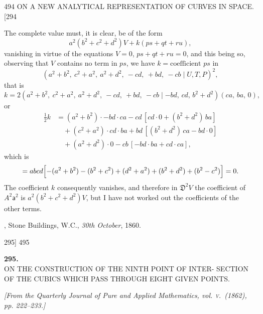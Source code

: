 \documentclass[11pt]{article}
\begin{document}
\newpage
\begin{center}
494 \hfill ON A NEW ANALYTICAL REPRESENTATION OF CURVES IN SPACE. \hfill \textsc{[294}
\end{center}

The complete value must, it is clear, be of the form
\[ a^{2}(b^{2}+c^{2}+d^{2})V+k(ps+qt+ru), \]
vanishing in virtue of the equations $V=0$, $ps+qt+ru=0$, and this being so, observing
that $V$ contains no term in $ps$, we have $k=\text{coefficient } ps$ in
\[ (a^{2}+b^{2},\ c^{2}+a^{2},\ a^{2}+d^{2},\ -cd,\ +bd,\ -cb \mid U,T,P)^{2}, \]
that is
\[ k=2(a^{2}+b^{2},\ c^{2}+a^{2},\ a^{2}+d^{2},\ -cd,\ +bd,\ -cb \mid -bd,\,cd,\,b^{2}+d^{2})(ca,\,ba,\,0), \]
or
\[ \begin{aligned}
\tfrac{1}{2}k &= (a^{2}+b^{2})\cdot -bd\cdot ca-cd\,[cd\cdot 0+(b^{2}+d^{2})\,ba]\\
&\quad +(c^{2}+a^{2})\cdot cd\cdot ba+bd\,[(b^{2}+d^{2})\,ca-bd\cdot 0]\\
&\quad +(a^{2}+d^{2})\cdot 0-cb\,[-bd\cdot ba+cd\cdot ca],
\end{aligned} \]
which is
\[ = abcd\Bigl[-(a^{2}+b^{2})-(b^{2}+c^{2})+(d^{2}+a^{2})+(b^{2}+d^{2})+(b^{2}-c^{2})\Bigr]=0. \]
The coefficient $k$ consequently vanishes, and therefore in $\mathfrak{D}^{2}V$ the coefficient of $A^{2}\mathsf{a}^{2}$
is $a^{2}(b^{2}+c^{2}+d^{2})V$, but I have not worked out the coefficients of the other terms.

\medskip
{}, Stone Buildings, W.C., \textit{30th October}, 1860.

\newpage
\begin{center}
\textsc{295]} \hfill \hfill 495
\end{center}

\begin{center}
\textbf{\large 295.}\\[1ex]
\textsc{ON THE CONSTRUCTION OF THE NINTH POINT OF INTER-%
SECTION OF THE CUBICS WHICH PASS THROUGH EIGHT
GIVEN POINTS.}
\end{center}

\begin{center}
\textit{[From the Quarterly Journal of Pure and Applied Mathematics, vol. \textsc{v}.\ (1862),
pp. 222--233.]}
\end{center}
\end{document}
